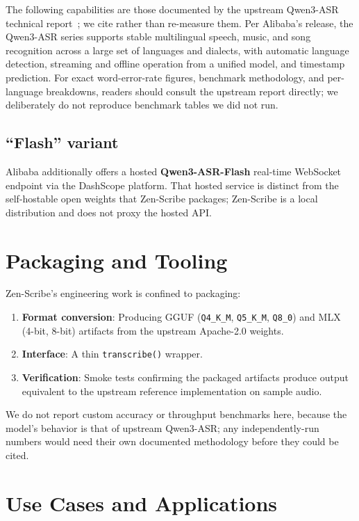 \documentclass[11pt,a4paper]{article}
\begin{document}
The following capabilities are those documented by the upstream Qwen3-ASR technical
report~\cite{qwen3asr}; we cite rather than re-measure them. Per Alibaba's release,
the Qwen3-ASR series supports stable multilingual speech, music, and song recognition
across a large set of languages and dialects, with automatic language detection,
streaming and offline operation from a unified model, and timestamp prediction. For
exact word-error-rate figures, benchmark methodology, and per-language breakdowns,
readers should consult the upstream report directly; we deliberately do not reproduce
benchmark tables we did not run.

\subsection{``Flash'' variant}

Alibaba additionally offers a hosted \textbf{Qwen3-ASR-Flash} real-time WebSocket
endpoint via the DashScope platform. That hosted service is distinct from the
self-hostable open weights that Zen-Scribe packages; Zen-Scribe is a local
distribution and does not proxy the hosted API.

\section{Packaging and Tooling}

Zen-Scribe's engineering work is confined to packaging:
\begin{enumerate}
    \item \textbf{Format conversion}: Producing GGUF (\texttt{Q4\_K\_M},
          \texttt{Q5\_K\_M}, \texttt{Q8\_0}) and MLX (4-bit, 8-bit) artifacts from
          the upstream Apache-2.0 weights.
    \item \textbf{Interface}: A thin \texttt{transcribe()} wrapper.
    \item \textbf{Verification}: Smoke tests confirming the packaged artifacts produce
          output equivalent to the upstream reference implementation on sample audio.
\end{enumerate}

We do not report custom accuracy or throughput benchmarks here, because the model's
behavior is that of upstream Qwen3-ASR; any independently-run numbers would need their
own documented methodology before they could be cited.

\section{Use Cases and Applications}
\end{document}
